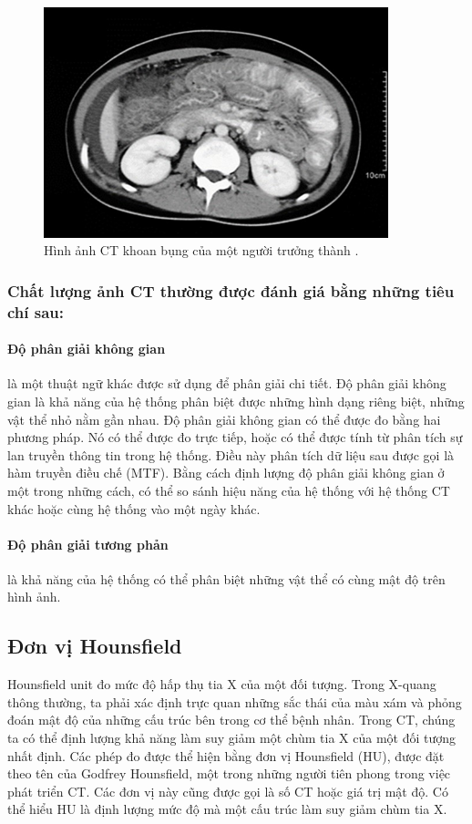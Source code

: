 \begin{figure}[H]
    \centering
    \includegraphics[width=10cm]{images/medicine/img9.jpg}
    \caption{Hình ảnh CT khoan bụng của một người trưởng thành \cite{ctimage}. }
\end{figure}

\subsubsection{Chất lượng ảnh CT thường được đánh giá bằng những tiêu chí sau:}
\paragraph{Độ phân giải không gian}là một thuật ngữ khác được sử dụng để phân giải chi tiết. Độ phân giải không gian là khả năng của hệ thống phân biệt được những hình dạng riêng biệt, những vật thể nhỏ nằm gần nhau. Độ phân giải không gian có thể được đo bằng hai phương pháp. Nó có thể được đo trực tiếp, hoặc có thể được tính từ phân tích sự lan truyền thông tin trong hệ thống.  Điều này phân tích dữ liệu sau được gọi là hàm truyền điều chế (MTF). Bằng cách định lượng độ phân giải không gian ở một trong những cách, có thể so sánh hiệu năng của hệ thống với hệ thống CT khác hoặc cùng hệ thống vào một ngày khác.
\vspace{-0.7cm}
\paragraph{Độ phân giải tương phản}là khả năng của hệ thống có thể phân biệt những vật thể có cùng mật độ trên hình ảnh. 

\subsection{Đơn vị Hounsfield}
Hounsfield unit đo mức độ hấp thụ tia X của một đối tượng. Trong X-quang thông thường, ta phải xác định trực quan những sắc thái của màu xám và phỏng đoán mật độ của những cấu trúc bên trong cơ thể bệnh nhân. Trong CT, chúng ta có thể định lượng khả năng làm suy giảm một chùm tia X của một đối tượng nhất định. Các phép đo được thể hiện bằng đơn vị Hounsfield (HU), được đặt theo tên của Godfrey Hounsfield, một trong những người tiên phong trong việc phát triển CT. Các đơn vị này cũng được gọi là số CT hoặc giá trị mật độ. Có thể hiểu HU là định lượng mức độ mà một cấu trúc làm suy giảm chùm tia X.\par

